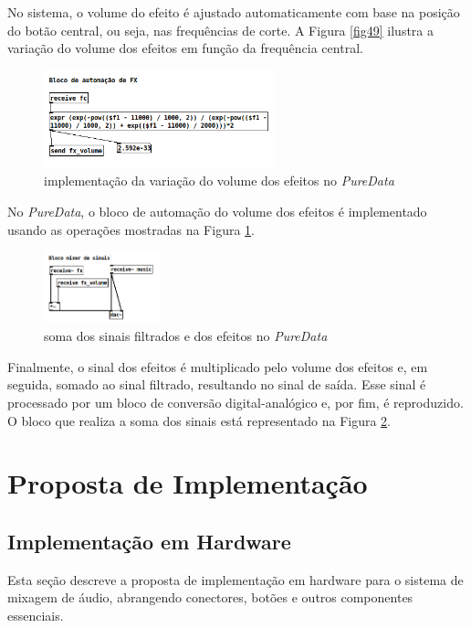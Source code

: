 No sistema, o volume do efeito é ajustado automaticamente com base na posição do botão central, ou seja, nas frequências de corte. A Figura \ref{fig49} ilustra a variação do volume dos efeitos em função da frequência central.

\begin{figure}[h]
    \centering
    \includegraphics[width=0.6\textwidth]{figuras/fig50.png}
    \caption{implementação da variação do volume dos efeitos no \textit{PureData}}
    \label{fig50}
\end{figure}

\newpage
No \textit{PureData}, o bloco de automação do volume dos efeitos é implementado usando as operações mostradas na Figura \ref{fig50}.

\begin{figure}[h]
    \centering
    \includegraphics[width=0.3\textwidth]{figuras/fig51.png}
    \caption{soma dos sinais filtrados e dos efeitos no \textit{PureData}}
    \label{fig51}
\end{figure}

Finalmente, o sinal dos efeitos é multiplicado pelo volume dos efeitos e, em seguida, somado ao sinal filtrado, resultando no sinal de saída. Esse sinal é processado por um bloco de conversão digital-analógico e, por fim, é reproduzido. O bloco que realiza a soma dos sinais está representado na Figura \ref{fig51}.

\section{Proposta de Implementação}

\subsection{Implementação em Hardware}

Esta seção descreve a proposta de implementação em hardware para o sistema de mixagem de áudio, abrangendo conectores, botões e outros componentes essenciais.

